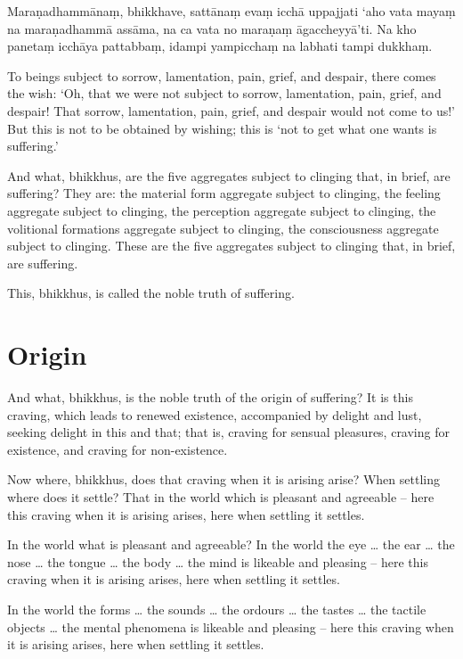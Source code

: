 Maraṇadhammānaṃ, bhikkhave, sattānaṃ evaṃ icchā uppajjati ‘aho vata mayaṃ na
maraṇadhammā assāma, na ca vata no maraṇaṃ āgaccheyyā’ti. Na kho panetaṃ icchāya
pattabbaṃ, idampi yampicchaṃ na labhati tampi dukkhaṃ.

\englishPage

To beings subject to sorrow, lamentation, pain, grief, and despair, there comes
the wish: `Oh, that we were not subject to sorrow, lamentation, pain, grief, and
despair! That sorrow, lamentation, pain, grief, and despair would not come to
us!' But this is not to be obtained by wishing; this is `not to get what one
wants is suffering.'

And what, bhikkhus, are the five aggregates subject to clinging that, in brief,
are suffering? They are: the material form aggregate subject to clinging, the
feeling aggregate subject to clinging, the perception aggregate subject to
clinging, the volitional formations aggregate subject to clinging, the
consciousness aggregate subject to clinging. These are the five aggregates
subject to clinging that, in brief, are suffering.

This, bhikkhus, is called the noble truth of suffering.

\section{Origin}

And what, bhikkhus, is the noble truth of the origin of suffering? It is this
craving, which leads to renewed existence, accompanied by delight and lust,
seeking delight in this and that; that is, craving for sensual pleasures,
craving for existence, and craving for non-existence.

Now where, bhikkhus, does that craving when it is arising arise? When settling
where does it settle? That in the world which is pleasant and agreeable -- here
this craving when it is arising arises, here when settling it settles.

In the world what is pleasant and agreeable? In the world the eye \ldots{} the
ear \ldots{} the nose \ldots{} the tongue \ldots{} the body \ldots{} the mind is
likeable and pleasing -- here this craving when it is arising arises, here when
settling it settles.

In the world the forms \ldots{} the sounds \ldots{} the ordours \ldots{} the
tastes \ldots{} the tactile objects \ldots{} the mental phenomena is likeable
and pleasing -- here this craving when it is arising arises, here when settling
it settles.

